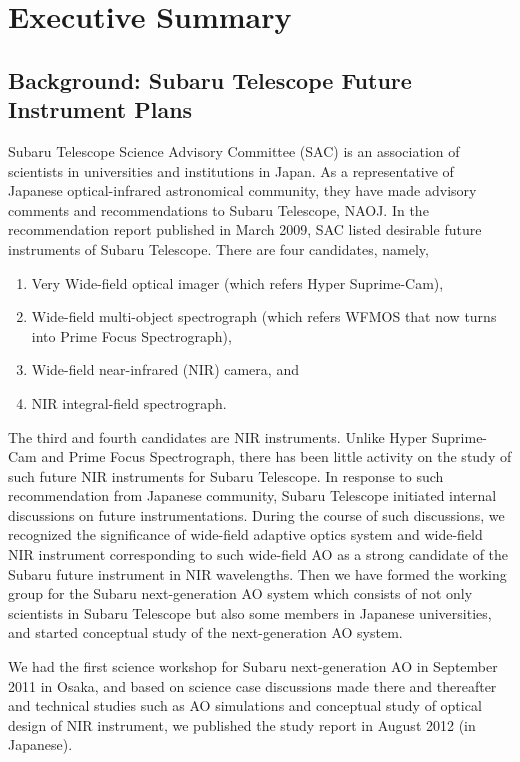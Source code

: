 \chapter{Executive Summary
\label{chap:exec_summary}}

\section{Background: Subaru Telescope Future Instrument Plans}

Subaru Telescope Science Advisory Committee (SAC) is an association of 
scientists in universities and institutions in Japan. As a
representative of Japanese optical-infrared astronomical community, they 
have made advisory comments and recommendations to Subaru Telescope,
NAOJ.
In the recommendation report published in March 2009, SAC listed
desirable future instruments of Subaru Telescope. There
are four candidates, namely,

\begin{enumerate}
\setlength{\itemsep}{-3pt}
\item Very Wide-field optical imager (which refers Hyper Suprime-Cam),
\item Wide-field multi-object spectrograph (which refers WFMOS that now
      turns into Prime Focus Spectrograph), 
\item Wide-field near-infrared (NIR) camera, and 
\item NIR integral-field spectrograph.
\end{enumerate}

The third and fourth candidates are NIR instruments. Unlike Hyper
Suprime-Cam and Prime Focus Spectrograph, there has been little activity
on the study of such future NIR instruments for Subaru Telescope.
In response to such recommendation from Japanese community, Subaru
Telescope initiated internal discussions on future instrumentations. 
During the course of such discussions, we recognized the significance of
wide-field adaptive optics system and wide-field NIR instrument
corresponding to such wide-field AO as a strong candidate of the Subaru
future instrument in NIR wavelengths.
Then we have formed the working group for the Subaru next-generation AO
system which consists of not only scientists in Subaru Telescope but
also some members in Japanese universities, and started conceptual study
of the next-generation AO system.

We had the first science workshop for Subaru next-generation AO in
September 2011 in Osaka, and based on science case discussions made
there and thereafter and technical studies such as AO simulations and
conceptual study of optical design of NIR instrument, we published the
study report in August 2012 (in Japanese). 

